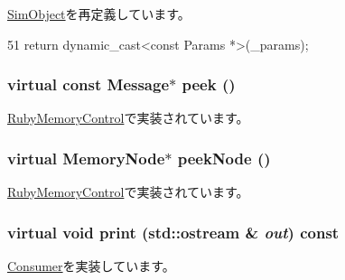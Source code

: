 \hyperlink{classSimObject_acd3c3feb78ae7a8f88fe0f110a718dff}{SimObject}を再定義しています。


\begin{DoxyCode}
51     { return dynamic_cast<const Params *>(_params); }
\end{DoxyCode}
\hypertarget{classMemoryControl_a822b263266795dc49c26e24dc6eb4b54}{
\subsubsection[{peek}]{\setlength{\rightskip}{0pt plus 5cm}virtual const {\bf Message}$\ast$ peek ()}}
\label{classMemoryControl_a822b263266795dc49c26e24dc6eb4b54}


\hyperlink{classRubyMemoryControl_ab635dc32ebecf260c15d8fbbbb9b21e0}{RubyMemoryControl}で実装されています。\hypertarget{classMemoryControl_a1daeb227a1c754432729a75c7997d275}{
\subsubsection[{peekNode}]{\setlength{\rightskip}{0pt plus 5cm}virtual {\bf MemoryNode}$\ast$ peekNode ()}}
\label{classMemoryControl_a1daeb227a1c754432729a75c7997d275}


\hyperlink{classRubyMemoryControl_a8ffbfb520369710755a1260b8451de3d}{RubyMemoryControl}で実装されています。\hypertarget{classMemoryControl_a3ea5f7af5db62cc24f4e40df9ea5c971}{
\subsubsection[{print}]{\setlength{\rightskip}{0pt plus 5cm}virtual void print (std::ostream \& {\em out}) const}}
\label{classMemoryControl_a3ea5f7af5db62cc24f4e40df9ea5c971}


\hyperlink{classConsumer_a3ea5f7af5db62cc24f4e40df9ea5c971}{Consumer}を実装しています。


